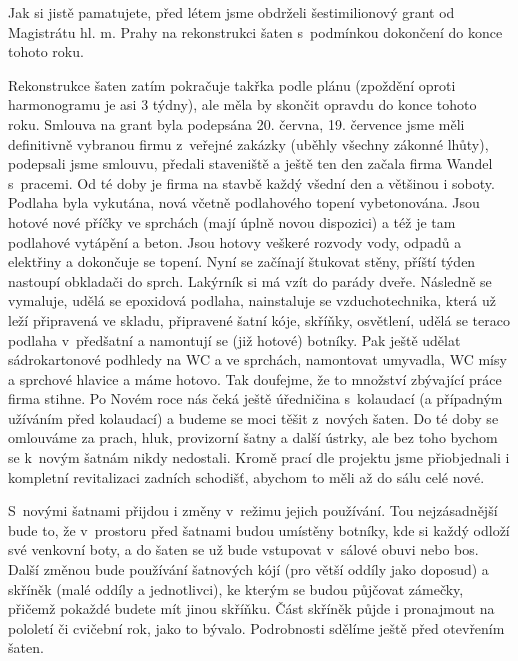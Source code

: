 \documentclass[11pt]{article}
\begin{document}
\clearpage
\nopagecolor
\normalcolor

\restoregeometry
\pagestyle{standard}

Jak si jistě pamatujete, před létem jsme obdrželi šestimilionový grant od Magistrátu hl. m. Prahy na rekonstrukci šaten s~podmínkou dokončení do konce tohoto roku.

Rekonstrukce šaten zatím pokračuje takřka podle plánu (zpoždění oproti harmonogramu je asi 3 týdny), ale měla by skončit opravdu do konce tohoto roku. Smlouva na grant byla podepsána 20. června, 19. července jsme měli definitivně vybranou firmu z~veřejné zakázky (uběhly všechny zákonné lhůty), podepsali jsme smlouvu, předali staveniště a ještě ten den začala firma Wandel s~pracemi. Od té doby je firma na stavbě každý všední den a většinou i soboty. Podlaha byla vykutána, nová včetně podlahového topení vybetonována. Jsou hotové nové příčky ve sprchách (mají úplně novou dispozici) a též je tam podlahové vytápění a beton. Jsou hotovy veškeré rozvody vody, odpadů a elektřiny a dokončuje se topení. Nyní se začínají štukovat stěny, příští týden nastoupí obkladači do sprch. Lakýrník si má vzít do parády dveře. Následně se vymaluje, udělá se epoxidová podlaha, nainstaluje se vzduchotechnika, která už leží připravená ve skladu, připravené šatní kóje, skříňky, osvětlení, udělá se teraco podlaha v~předšatní a namontují se (již hotové) botníky. Pak ještě udělat sádrokartonové podhledy na WC a ve sprchách, namontovat umyvadla, WC mísy a sprchové hlavice a máme hotovo. Tak doufejme, že to množství zbývající práce firma stihne. Po Novém roce nás čeká ještě úředničina s~kolaudací (a případným užíváním před kolaudací) a budeme se moci těšit z~nových šaten. Do té doby se omlouváme za prach, hluk, provizorní šatny a další ústrky, ale bez toho bychom se k~novým šatnám nikdy nedostali. Kromě prací dle projektu jsme přiobjednali i kompletní revitalizaci zadních schodišť, abychom to měli až do sálu celé nové.

S~novými šatnami přijdou i změny v~režimu jejich používání. Tou nejzásadnější bude to, že v~prostoru před šatnami budou umístěny botníky, kde si každý odloží své venkovní boty, a do šaten se už bude vstupovat v~sálové obuvi nebo bos. Další změnou bude používání šatnových kójí (pro větší oddíly jako doposud) a skříněk (malé oddíly a jednotlivci), ke kterým se budou půjčovat zámečky, přičemž pokaždé budete mít jinou skříňku. Část skříněk půjde i pronajmout na pololetí či cvičební rok, jako to bývalo. Podrobnosti sdělíme ještě před otevřením šaten.
\end{document}

